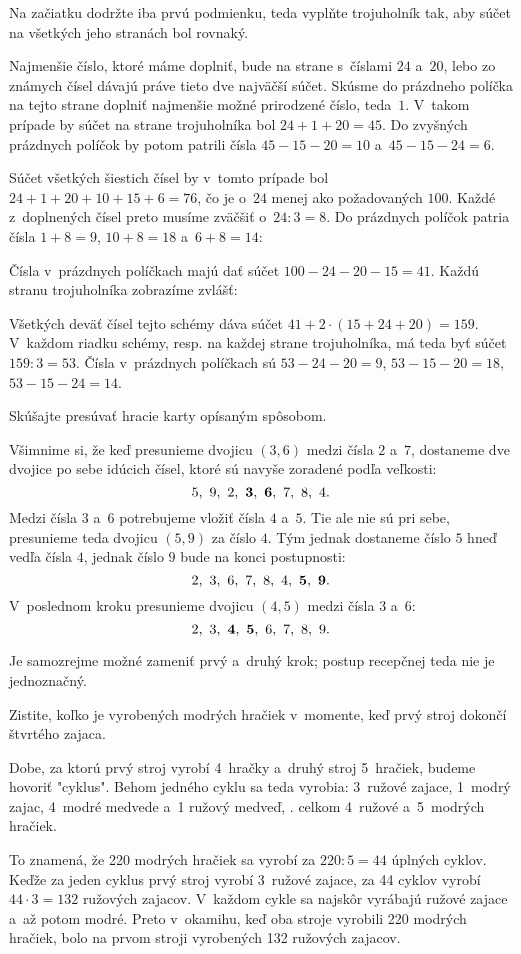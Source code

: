 {%
\napad
Na začiatku dodržte iba prvú podmienku, teda vyplňte trojuholník tak, aby súčet na všetkých jeho stranách bol rovnaký.

\riesenie
Najmenšie číslo, ktoré máme doplniť, bude na strane s~číslami $24$ a~$20$, lebo zo
známych čísel dávajú práve tieto dve najväčší súčet. Skúsme do prázdneho
políčka na tejto strane doplniť najmenšie možné prirodzené číslo, teda~$1$.
V~takom prípade by súčet na strane trojuholníka bol $24+1+20=45$.
Do zvyšných prázdnych políčok by potom patrili čísla $45-15-20=10$ a~$45-15-24=6$.

Súčet všetkých šiestich čísel by v~tomto prípade bol $24+1+20+10+15+6=76$, čo je
o~$24$ menej ako požadovaných $100$.
Každé z~doplnených čísel preto musíme zväčšiť o~$24:3=8$.
Do prázdnych políčok patria čísla $1+8=9$, $10+8=18$ a~$6+8=14$:
%

\ineriesenie
Čísla v~prázdnych políčkach majú dať súčet $100-24-20-15=41$. Každú stranu trojuholníka zobrazíme zvlášť:
%

Všetkých deväť čísel tejto schémy dáva súčet $41+2\cdot(15+24+20)=159$.
V~každom riadku schémy, resp. na každej strane trojuholníka, má teda
byť súčet $159:3=53$.
Čísla v~prázdnych políčkach sú
$53-24-20=9$, $53-15-20=18$, $53-15-24=14$.
}

{%
\napad
Skúšajte presúvať hracie karty opísaným spôsobom.

\riesenie
Všimnime si, že keď presunieme dvojicu $(3, 6)$ medzi čísla $2$ a~$7$,
dostaneme dve dvojice po sebe idúcich čísel, ktoré sú navyše
zoradené podľa veľkosti:
$$
5,\ 9,\ 2,\ \text{\bf3},\ \text{\bf6},\ 7,\ 8,\ 4.
$$
Medzi čísla $3$ a~$6$ potrebujeme vložiť čísla $4$ a~$5$. Tie ale nie sú pri sebe,
presunieme teda dvojicu $(5, 9)$ za číslo $4$. Tým jednak dostaneme číslo
$5$ hneď vedľa čísla $4$, jednak číslo $9$ bude na konci postupnosti:
$$
2,\ 3,\ 6,\ 7,\ 8,\ 4,\ \text{\bf5},\ \text{\bf9}.
$$
V~poslednom kroku presunieme dvojicu $(4, 5)$ medzi čísla $3$ a~$6$:
$$
2,\ 3,\ \text{\bf4},\ \text{\bf5},\ 6,\ 7,\ 8,\ 9.
$$

\poznamka
Je samozrejme možné zameniť prvý a~druhý krok; postup recepčnej teda nie je
jednoznačný.
}

{%
\napad
Zistite, koľko je vyrobených modrých hračiek v~momente, keď prvý stroj dokončí
štvrtého zajaca.

\riesenie
Dobe, za ktorú prvý stroj vyrobí 4~hračky a~druhý stroj 5~hračiek, budeme
hovoriť "cyklus". Behom jedného cyklu sa teda vyrobia:
3~ružové zajace, 1~modrý zajac, 4~modré medvede a~1 ružový medveď,
\tj. celkom 4~ružové a~5~modrých hračiek.

To znamená, že 220 modrých hračiek sa vyrobí za $220:5=44$ úplných cyklov.
Keďže za jeden cyklus prvý stroj vyrobí 3~ružové zajace, za 44 cyklov
vyrobí $44\cdot3=132$ ružových zajacov.
V~každom cykle sa najskôr vyrábajú ružové zajace a~až potom modré.
Preto v~okamihu, keď oba stroje vyrobili 220 modrých hračiek, bolo na prvom stroji
vyrobených 132 ružových zajacov.
}

